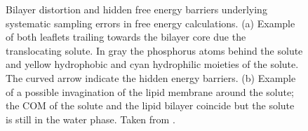 \begin{figure}[ht!]
	\centering
	\qquad%
	\caption{Bilayer distortion and hidden free energy barriers underlying systematic sampling errors in free energy calculations. (a) Example of both leaflets trailing towards the bilayer core due the translocating solute. In gray the phosphorus atoms behind the solute and yellow hydrophobic and cyan hydrophilic moieties of the solute. The curved arrow indicate the hidden energy barriers. (b) Example of a possible invagination of the lipid membrane around the solute; the \acs{COM} of the solute and the lipid bilayer coincide but the solute is still in the water phase. Taken from \cite{Neale2016}.}%
\end{figure}

